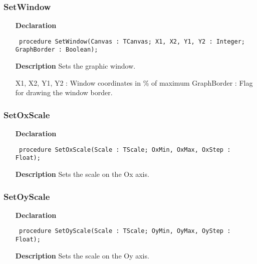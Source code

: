 \documentclass[12pt,a4paper,oneside]{report}
\newcommand{\declarationitem}[1]{\textbf{#1}}
\newcommand{\descriptiontitle}[1]{\textbf{#1}}
\newcommand{\code}[1]{\texttt{#1}}
\begin{document}
\subsubsection{SetWindow}
\label{uwinplot-SetWindow}
\begin{itemize}\item[\declarationitem{Declaration}\hfill]
	\begin{flushleft}
		\code{
			procedure SetWindow(Canvas : TCanvas; X1, X2, Y1, Y2 : Integer; GraphBorder : Boolean);}
		
	\end{flushleft}
	
	\par
	\item[\descriptiontitle{Description}]
	Sets the graphic window.
	
	X1, X2, Y1, Y2 : Window coordinates in {\%} of maximum GraphBorder : Flag for drawing the window border.
	
\end{itemize}
\subsubsection{SetOxScale}
\label{uwinplot-SetOxScale}
\begin{itemize}\item[\declarationitem{Declaration}\hfill]
	\begin{flushleft}
		\code{
			procedure SetOxScale(Scale : TScale; OxMin, OxMax, OxStep : Float);}
		
	\end{flushleft}
	
	\par
	\item[\descriptiontitle{Description}]
	Sets the scale on the Ox axis.
	
\end{itemize}
\subsubsection{SetOyScale}
\label{uwinplot-SetOyScale}
\begin{itemize}\item[\declarationitem{Declaration}\hfill]
	\begin{flushleft}
		\code{
			procedure SetOyScale(Scale : TScale; OyMin, OyMax, OyStep : Float);}
		
	\end{flushleft}
	
	\par
	\item[\descriptiontitle{Description}]
	Sets the scale on the Oy axis.
	
\end{itemize}
\end{document}
